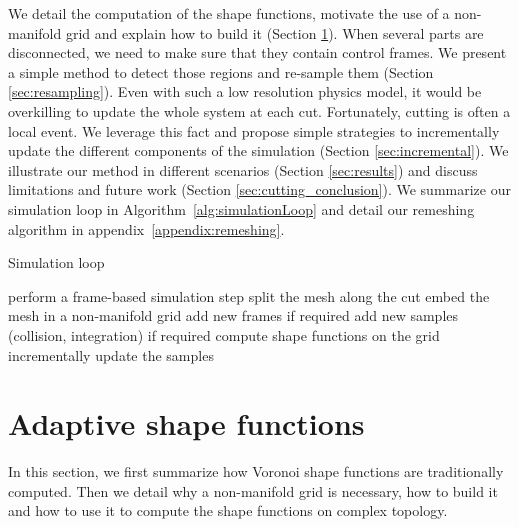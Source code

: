 We detail the computation of the shape functions, motivate the use of a non-manifold grid and explain how to build it (Section \ref{sec:adaptivesf}). When several parts are disconnected, we need to make sure that they contain control frames. We present a simple method to detect those regions and re-sample them (Section \ref{sec:resampling}). Even with such a low resolution physics model, it would be overkilling to update the whole system at each cut. Fortunately, cutting is often a local event. We leverage this fact and propose simple strategies to incrementally update the different components of the simulation (Section \ref{sec:incremental}). We illustrate our method in different scenarios (Section \ref{sec:results}) and discuss limitations and future work (Section \ref{sec:cutting_conclusion}). We summarize our simulation loop in Algorithm~\ref{alg:simulationLoop} and detail our remeshing algorithm in appendix~\ref{appendix:remeshing}.

\begin{algorithm}[!h]
\caption[Frame-based cutting: Simulation loop]{\label{alg:simulationLoop}Simulation loop}
\begin{algorithmic}[0]
	\State perform a frame-based simulation step
	\State split the mesh along the cut
	\State embed the mesh in a non-manifold grid
	\State add new frames if required
	\State add new samples (collision, integration) if required
	\State compute shape functions on the grid
	\State incrementally update the samples
\EndFor
\end{algorithmic}
\end{algorithm}

\section{Adaptive shape functions} \label{sec:adaptivesf}

In this section, we first summarize how Voronoi shape functions are traditionally computed. Then we detail why a non-manifold grid is necessary, how to build it and how to use it to compute the shape functions on complex topology.

